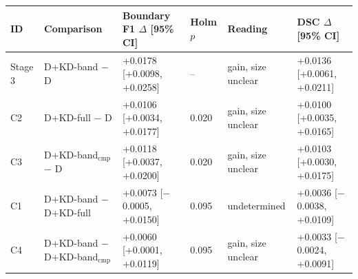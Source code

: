 \begin{tabular}{@{}llllll@{}}
\toprule
ID & Comparison & Boundary F1 $\Delta$ [95\% CI] & Holm $p$ & Reading & DSC $\Delta$ [95\% CI] \\
\midrule
Stage 3 & D+KD-band $-$ D & +0.0178 [+0.0098, +0.0258] & -- & gain, size unclear & +0.0136 [+0.0061, +0.0211] \\
\midrule
C2 & D+KD-full $-$ D & +0.0106 [+0.0034, +0.0177] & 0.020 & gain, size unclear & +0.0100 [+0.0035, +0.0165] \\
C3 & D+KD-band$_{\mathrm{cmp}}$ $-$ D & +0.0118 [+0.0037, +0.0200] & 0.020 & gain, size unclear & +0.0103 [+0.0030, +0.0175] \\
C1 & D+KD-band $-$ D+KD-full & +0.0073 [$-$0.0005, +0.0150] & 0.095 & undetermined & +0.0036 [$-$0.0038, +0.0109] \\
C4 & D+KD-band $-$ D+KD-band$_{\mathrm{cmp}}$ & +0.0060 [+0.0001, +0.0119] & 0.095 & gain, size unclear & +0.0033 [$-$0.0024, +0.0091] \\
\bottomrule
\end{tabular}
